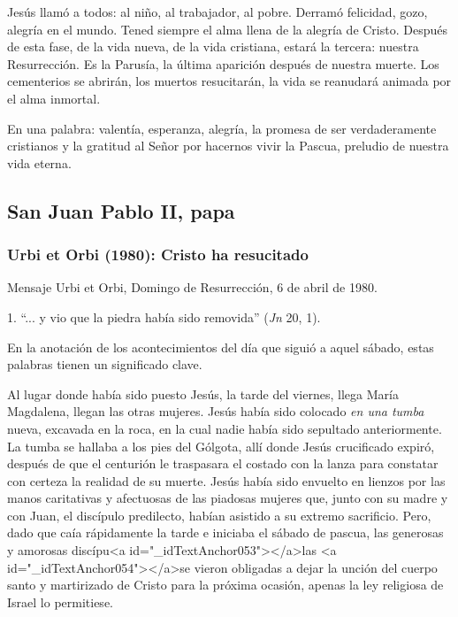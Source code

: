 			\begin{body}Jesús llamó a todos: al niño, al trabajador, al pobre. Derramó felicidad, gozo, alegría en el mundo. Tened siempre el alma llena de la alegría de Cristo. Después de esta fase, de la vida nueva, de la vida cristiana, estará la tercera: nuestra Resurrección. Es la Parusía, la última aparición después de nuestra muerte. Los cementerios se abrirán, los muertos resucitarán, la vida se reanudará animada por el alma inmortal. \end{body}
			
			\begin{body}En una palabra: valentía, esperanza, alegría, la promesa de ser verdaderamente cristianos y la gratitud al Señor por hacernos vivir la Pascua, preludio de nuestra vida eterna.\end{body}
			
			\subsection{San Juan Pablo II, papa}
			
			\subsubsection{Urbi et Orbi (1980): Cristo ha resucitado}
			
			\begin{referencia}Mensaje Urbi et Orbi, Domingo de Resurrección, 6 de abril de 1980.\end{referencia}
			
			\begin{body}1. “... y vio que la piedra había sido removida” (\textit{Jn} 20, 1).\end{body}
			
			\begin{body}En la anotación de los acontecimientos del día que siguió a aquel sábado, estas palabras tienen un significado clave.\end{body}
			
			\begin{body}Al lugar donde había sido puesto Jesús, la tarde del viernes, llega María Magdalena, llegan las otras mujeres. Jesús había sido colocado \textit{en una tumba} nueva, excavada en la roca, en la cual nadie había sido sepultado anteriormente. La tumba se hallaba a los pies del Gólgota, allí donde Jesús crucificado expiró, después de que el centurión le traspasara el costado con la lanza para constatar con certeza la realidad de su muerte. Jesús había sido envuelto en lienzos por las manos caritativas y afectuosas de las piadosas mujeres que, junto con su madre y con Juan, el discípulo predilecto, habían asistido a su extremo sacrificio. Pero, dado que caía rápidamente la tarde e iniciaba el sábado de pascua, las generosas y amorosas discípu<a id="_idTextAnchor053"></a>las <a id="_idTextAnchor054"></a>se vieron obligadas a dejar la unción del cuerpo santo y martirizado de Cristo para la próxima ocasión, apenas la ley religiosa de Israel lo permitiese.\end{body}
			
